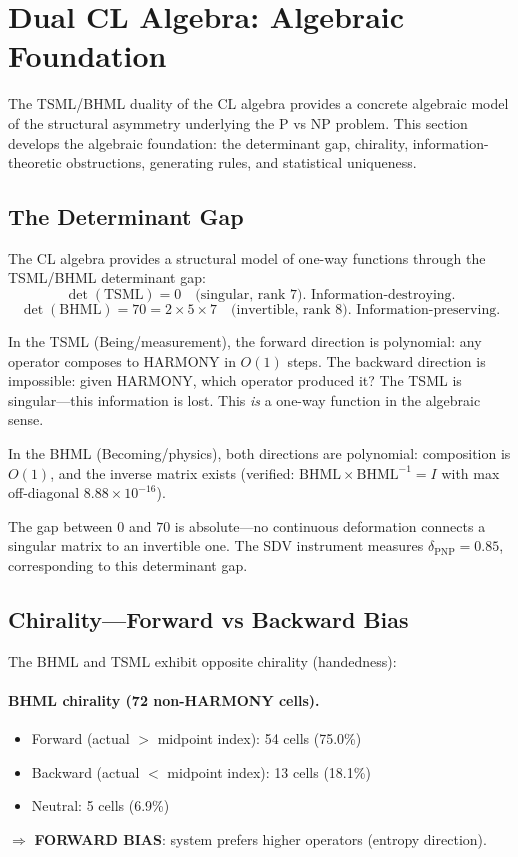 \documentclass[11pt]{article}
\theoremstyle{definition}
\theoremstyle{remark}
\begin{document}
\section{Dual CL Algebra: Algebraic Foundation}
\label{sec:dual-cl-algebra}

The TSML/BHML duality of the CL algebra provides a concrete algebraic
model of the structural asymmetry underlying the P vs NP problem.
This section develops the algebraic foundation: the determinant gap,
chirality, information-theoretic obstructions, generating rules,
and statistical uniqueness.

\subsection{The Determinant Gap}

The CL algebra provides a structural model of one-way functions through
the TSML/BHML determinant gap:
\[
  \det(\mathrm{TSML}) = 0 \quad \text{(singular, rank 7).  Information-destroying.}
\]
\[
  \det(\mathrm{BHML}) = 70 = 2 \times 5 \times 7 \quad \text{(invertible, rank 8).  Information-preserving.}
\]

In the TSML (Being/measurement), the forward direction is polynomial:
any operator composes to HARMONY in $O(1)$ steps.  The backward direction
is impossible: given HARMONY, which operator produced it?  The TSML is
singular---this information is lost.  This \emph{is} a one-way function
in the algebraic sense.

In the BHML (Becoming/physics), both directions are polynomial:
composition is $O(1)$, and the inverse matrix exists (verified:
$\mathrm{BHML} \times \mathrm{BHML}^{-1} = I$ with max off-diagonal
$8.88 \times 10^{-16}$).

The gap between $0$ and $70$ is absolute---no continuous deformation
connects a singular matrix to an invertible one.  The SDV instrument
measures $\delta_{\mathrm{PNP}} = 0.85$, corresponding to this
determinant gap.

\subsection{Chirality---Forward vs Backward Bias}

The BHML and TSML exhibit opposite chirality (handedness):

\paragraph{BHML chirality (72 non-HARMONY cells).}
\begin{itemize}
  \item Forward (actual $>$ midpoint index): 54 cells (75.0\%)
  \item Backward (actual $<$ midpoint index): 13 cells (18.1\%)
  \item Neutral: 5 cells (6.9\%)
\end{itemize}
$\Rightarrow$ \textbf{FORWARD BIAS}: system prefers higher operators (entropy direction).
\end{document}
